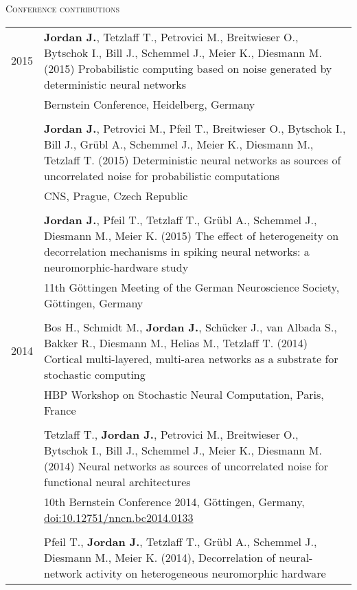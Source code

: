 \documentclass[a4paper,10pt]{article}
\begin{document}
\textsc{Conference contributions}\\[1em]
\begin{tabular}{>{\hfill}p{1.6cm} p{}}
  2015 & \textbf{Jordan J.}, Tetzlaff T., Petrovici M., Breitwieser O., Bytschok I., Bill J., Schemmel J., Meier K., Diesmann M. (2015) Probabilistic computing based on noise generated by deterministic neural networks\\
  & \footnotesize Bernstein Conference, Heidelberg, Germany\\
 \multicolumn{2}{c}{} \\
  & \textbf{Jordan J.}, Petrovici M., Pfeil T., Breitwieser O., Bytschok I., Bill J., Gr\"ubl A., Schemmel J., Meier K., Diesmann M., Tetzlaff T. (2015) Deterministic neural networks as sources of uncorrelated noise for probabilistic computations\\
  & \footnotesize CNS, Prague, Czech Republic\\
 \multicolumn{2}{c}{} \\
  & \textbf{Jordan J.}, Pfeil T., Tetzlaff T., Gr\"ubl A., Schemmel J., Diesmann M., Meier K. (2015) The effect of heterogeneity on decorrelation mechanisms in spiking neural networks: a neuromorphic-hardware study \\
  & \footnotesize 11th G\"ottingen Meeting of the German Neuroscience Society, G\"ottingen, Germany \\
  \multicolumn{2}{c}{} \\
  2014 & Bos H., Schmidt M., \textbf{Jordan J.}, Sch\"ucker J., van Albada S., Bakker R., Diesmann M., Helias M., Tetzlaff T. (2014) Cortical multi-layered, multi-area networks as a substrate for stochastic computing \\
  & \footnotesize HBP Workshop on Stochastic Neural Computation, Paris, France \\
  \multicolumn{2}{c}{} \\
  &  Tetzlaff T., \textbf{Jordan J.}, Petrovici M., Breitwieser O., Bytschok I., Bill J., Schemmel J., Meier K., Diesmann M. (2014) Neural networks as sources of uncorrelated noise for functional neural architectures \\
  & \footnotesize 10th Bernstein Conference 2014, G\"ottingen, Germany, \href{http://dx.doi.org/10.12751/nncn.bc2014.0133}{doi:10.12751/nncn.bc2014.0133} \\
  \multicolumn{2}{c}{} \\
  & Pfeil T., \textbf{Jordan J.}, Tetzlaff T., Gr\"ubl A., Schemmel J., Diesmann M., Meier K. (2014), Decorrelation of neural-network activity on heterogeneous neuromorphic hardware \\

\end{tabular}
\end{document}
